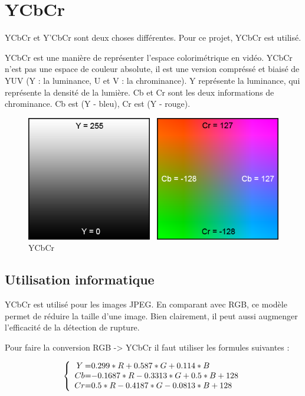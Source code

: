 \section{YCbCr}

YCbCr et Y’CbCr sont deux choses différentes. Pour ce projet, YCbCr est utilisé.

YCbCr est une manière de représenter l’espace colorimétrique en vidéo. YCbCr n’est pas une espace de couleur absolute, il est une version compréssé et biaisé de YUV (Y : la luminance, U et V : la chrominance). Y représente la luminance, qui représente la densité de la lumière. Cb et Cr sont les deux informations de chrominance. Cb est (Y - bleu), Cr est (Y - rouge).

\begin{figure}[h!]
      \centering
      \includegraphics[scale=0.6]{img/YCbCr.png}
      \caption{\label{YCbCr}YCbCr}
\end{figure}


\subsection{Utilisation informatique}
YCbCr est utilisé pour les images JPEG. En comparant avec RGB, ce modèle permet de réduire la taille d’une image. Bien clairement, il peut aussi augmenger l’efficacité de la détection de rupture.

Pour faire la conversion RGB -> YCbCr il faut utiliser les formules suivantes :

\[
 \left \{
 \begin{array}{c @{=} l}
	Y & 0.299 * R + 0.587 * G + 0.114 * B \\
	Cb & -0.1687 * R - 0.3313 * G + 0.5 * B + 128 \\
	Cr & 0.5 * R - 0.4187 * G - 0.0813 * B + 128 \\
 \end{array}
 \right.
\]

